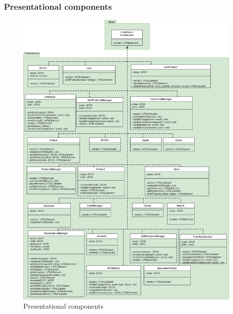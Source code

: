 \subsubsection{Presentational components}
\begin{figure}[h]
	\centering\includegraphics[scale = 0.36]{res/images/Presentational.png}
	\caption{Presentational components}
\end{figure}
